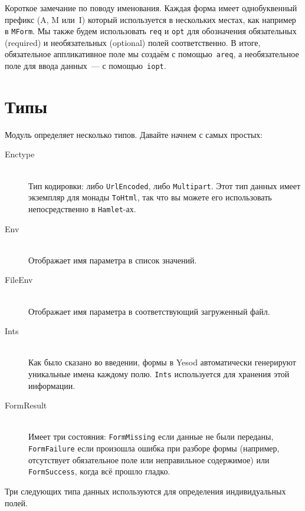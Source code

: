 Короткое замечание по поводу именования. Каждая форма имеет однобуквенный
префикс (A, M или~I) который используется в нескольких местах, как например в
\lstinline'MForm'. Мы также будем использовать \lstinline'req' и
\lstinline'opt' для обозначения обязательных (required) и необязательных
(optional) полей соответственно. В итоге, обязательное
аппликативное поле мы создаём с помощью~\lstinline'areq', а необязательное
поле для ввода данных~--- с помощью~\lstinline'iopt'.

\section{Типы}

Модуль  
определяет несколько типов. Давайте начнем с самых простых:

\begin{description}
\item[Enctype] \hfill \\
Тип кодировки: либо \lstinline'UrlEncoded', либо \lstinline'Multipart'. Этот тип данных
имеет экземпляр для монады \lstinline'ToHtml', так что вы можете его использовать
непосредственно в \lstinline'Hamlet'-ах.

\item[Env] \hfill \\
Отображает имя параметра в список значений.

\item[FileEnv] \hfill \\
Отображает имя параметра в соответствующий загруженный файл.

\item[Ints] \hfill \\
Как было сказано во введении, формы в Yesod автоматически генерируют уникальные имена 
каждому полю. \lstinline'Ints' используется для хранения этой информации.

\item[FormResult] \hfill \\
Имеет три состояния: \lstinline'FormMissing' если данные не были переданы,
\lstinline'FormFailure' если произошла ошибка при разборе формы (например, отсутствует
обязательное поле или неправильное содержимое) или \lstinline'FormSuccess', когда всё прошло
гладко.
\end{description}

Три следующих типа данных используются для определения индивидуальных
 полей.

